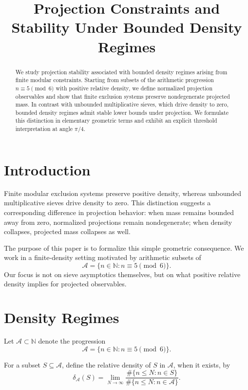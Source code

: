 \documentclass[11pt]{article}
\title{Projection Constraints and Stability Under Bounded Density Regimes}
\author{}
\date{}
\theoremstyle{plain}
\theoremstyle{definition}
\begin{document}
\maketitle

\begin{abstract}
We study projection stability associated with bounded density regimes arising from finite modular constraints. Starting from subsets of the arithmetic progression $n \equiv 5 \pmod{6}$ with positive relative density, we define normalized projection observables and show that finite exclusion systems preserve nondegenerate projected mass. In contrast with unbounded multiplicative sieves, which drive density to zero, bounded density regimes admit stable lower bounds under projection. We formulate this distinction in elementary geometric terms and exhibit an explicit threshold interpretation at angle $\pi/4$.
\end{abstract}

\section{Introduction}

Finite modular exclusion systems preserve positive density, whereas unbounded multiplicative sieves drive density to zero. This distinction suggests a corresponding difference in projection behavior: when mass remains bounded away from zero, normalized projections remain nondegenerate; when density collapses, projected mass collapses as well.

The purpose of this paper is to formalize this simple geometric consequence. We work in a finite-density setting motivated by arithmetic subsets of
\[
\mathcal{A} = \{ n \in \mathbb{N} : n \equiv 5 \pmod{6} \}.
\]
Our focus is not on sieve asymptotics themselves, but on what positive relative density implies for projected observables.

\section{Density Regimes}

Let $\mathcal{A} \subset \mathbb{N}$ denote the progression
\[
\mathcal{A} = \{ n \in \mathbb{N} : n \equiv 5 \pmod{6} \}.
\]

For a subset $S \subseteq \mathcal{A}$, define the relative density of $S$ in $\mathcal{A}$, when it exists, by
\[
\delta_{\mathcal{A}}(S)
=
\lim_{N \to \infty}
\frac{\#\{n \le N : n \in S\}}
{\#\{n \le N : n \in \mathcal{A}\}}.
\]
\end{document}
